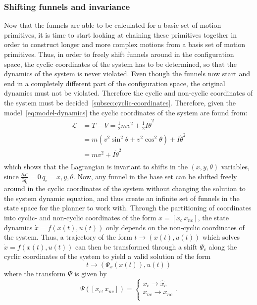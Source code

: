 \subsubsection{Shifting funnels and invariance}

Now that the funnels are able to be calculated for a basic set of motion
primitives, it is time to start looking at chaining these primitives together in
order to construct longer and more complex motions from a basis set of motion
primitives. Thus, in order to freely shift funnels around in the configuration
space, the cyclic coordinates of the system has to be determined, so that the
dynamics of the system is never violated. Even though the funnels now start and
end in a completely different part of the configuration space, the original
dynamics must not be violated. Therefore the cyclic and non-cyclic coordinates
of the system must be decided~\cref{subsec:cyclic-coordinates}. Therefore, given
the model~\cref{eq:model-dynamics} the cyclic coordinates of the system are
found from:
\begin{align*}
  \mathcal{L} &= T - V = \frac{1}{2} mv^2 + \frac{1}{2}I\dot{\theta}^2 \\ 
              &= m \left(
                v^2 \sin^2 \theta + v^2 \cos^2 \theta
                \right)  + I {\dot{\theta}}^2 \\
              &= mv^2 + I {\dot{\theta}}^2 \\
\end{align*}
which shows that the Lagrangian is invariant to shifts in the \((x,y,\theta)\)
variables, since \(\frac{\partial\mathcal{L}}{\partial q_i} = 0 \, q_i =
x,y,\theta\). Now, any funnel in the base set can be shifted freely around in
the cyclic coordinates of the system without changing the solution to the system
dynamic equation, and thus create an infinite set of funnels in the state space
for the planner to work with. Through the partitioning of coordinates into
cyclic- and non-cyclic coordinates of the form \(x = [x_c\, x_{nc}]\), the state
dynamics \(\dot{x} = f(x(t), u(t))\) only depends on the non-cyclic coordinates
of the system. Thus, a trajectory of the form \(t \rightarrow (x(t),u(t))\)
which solves \(\dot{x} = f(x(t),u(t))\) can then be transformed through a shift
\(\Psi_c\) along the cyclic coordinates of the system to yield a valid solution
of the form
\[
  t \rightarrow (\Psi_{x}(x(t)), u(t))
\]
where the transform \(\Psi\) is given by
\[
  \Psi([x_c, x_{nc}]) =
  \begin{cases}
    x_c \rightarrow \hat{x}_{c} \\
    x_{nc} \rightarrow x_{nc} \\
  \end{cases}.
\]

